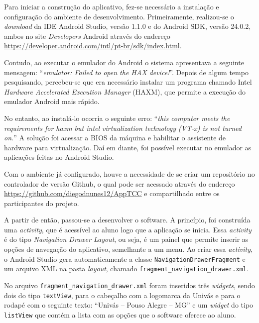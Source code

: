 	\par Para iniciar a construção do aplicativo, fez-se necessário a instalação e
configuração do ambiente de desenvolvimento. Primeiramente, realizou-se o
\textit{download} da IDE Android Studio, versão 1.1.0 e do Android SDK, versão
24.0.2, ambos no site \textit{Developers} Android através do endereço
\url{https://developer.android.com/intl/pt-br/sdk/index.html}.

	\par Contudo, ao executar o emulador do Android o sistema apresentava a
seguinte mensagem: “\textit{emulator: Failed to open the HAX device!}”. Depois
de algum tempo pesquisando, percebeu-se que era necessário instalar um programa
chamado Intel \textit{Hardware Accelerated Execution Manager} (HAXM), que
permite a execução do emulador Android mais rápido.

	\par No entanto, ao instalá-lo ocorria o seguinte erro: “\textit{this computer
meets the requirements for haxm but intel virtualization technology (VT-x) is
not turned on.}” A solução foi acessar a BIOS da máquina e habilitar o
assistente de hardware para virtualização. Daí em diante, foi possível executar
no emulador as aplicações feitas no Android Studio.

	\par Com o ambiente já configurado, houve a necessidade de se criar um
repositório no controlador de versão Github, o qual pode ser acessado através
do endereço \url{https://github.com/diegodnunes12/AppTCC} e compartilhado entre
os participantes do projeto.

	\par A partir de então, passou-se a desenvolver o software. A princípio, foi
construída uma \textit{activity}, que é acessível ao aluno logo que a aplicação
se inicia. Essa \textit{activity} é do tipo \textit{Navigation Drawer Layout},
ou seja, é um painel que permite inserir as opções de navegação do aplicativo,
semelhante a um menu.	Ao criar essa \textit{activity}, o Android Studio gera
automaticamente a classe \texttt{NavigationDrawerFragment} e um arquivo XML na
pasta \textit{layout}, chamado \texttt{fragment\_navigation\_drawer.xml}.

	\par No arquivo \texttt{fragment\_navigation\_drawer.xml} foram inseridos três
\textit{widgets}, sendo dois do tipo \texttt{textView}, para o cabeçalho com a
logomarca da Univás e para o rodapé com o seguinte texto: “Univás – Pouso
Alegre – MG” e um \textit{widget} do tipo \texttt{listView} que contém a lista
com as opções que o software oferece ao aluno.

